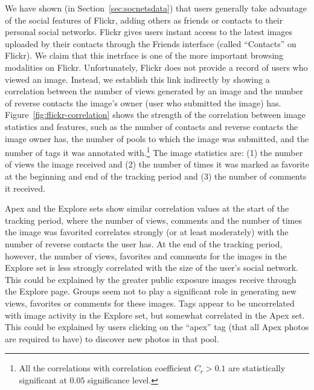 \documentclass[]{article}
\newcommand{\source}[1]{\textsf{#1}}
\newcommand{\secref}[1]{Section~\ref{#1}}
\newcommand{\figref}[1]{Figure~\ref{#1}}
\begin{document}
We have shown (in \secref{sec:socnetsdata}) that users
generally take advantage of the social features of Flickr, adding others
as friends or contacts to their personal social networks. Flickr
gives users instant access to the latest images uploaded by their
contacts through the Friends interface (called ``Contacts'' on Flickr).
We claim that this inetrface is one of the more important browsing modalities on Flickr.
Unfortunately, Flickr does not provide a record of users who viewed an image.
Instead, we establish this link indirectly by showing a correlation
between the number of views generated by an image and the number of
reverse contacts the image's owner (user who submitted the image) has.
\figref{fig:flickr-correlation} shows the strength of the correlation
between image statistics and features, such as the number of
contacts and reverse contacts the image owner has,
the number of pools to which the image was submitted, and the number
of tags it was annotated with.\footnote{All the correlations with
correlation coefficient $C_r>0.1$ are statistically significant at
$0.05$ significance level. } The image statistics are: (1) the
number of views the image received and (2) the number of times it
was marked as favorite at the beginning and end of the tracking period and
(3) the number of comments it received.


\source{Apex} and the \source{Explore} sets show similar correlation
values at the start of the tracking period, where the number of
views, comments and the number of times the image was favorited
correlates strongly (or at least moderately) with the number of
reverse contacts the user has. At the end of the tracking period,
however, the number of views, favorites and comments for the images
in the \source{Explore} set is less strongly correlated with the
size of the user's social network. This could be explained by the greater
public exposure images receive through the Explore page. Groups seem
not to play a significant role in generating new views, favorites or
comments for these images. Tags appear to be uncorrelated with
image activity in the \source{Explore} set, but somewhat correlated
in the \source{Apex} set. This could be explained by users clicking
on the ``apex'' tag (that all \source{Apex} photos are required to
have) to discover new photos in that pool.
\end{document}
